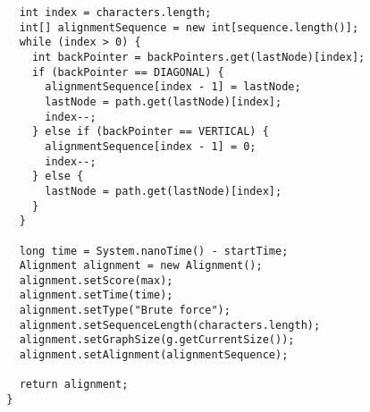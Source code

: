 \documentclass[thesis.tex]{subfiles}
\begin{document}
\begin{lstlisting}
    int index = characters.length;
    int[] alignmentSequence = new int[sequence.length()];
    while (index > 0) {
      int backPointer = backPointers.get(lastNode)[index];
      if (backPointer == DIAGONAL) {
        alignmentSequence[index - 1] = lastNode;
        lastNode = path.get(lastNode)[index];
        index--;
      } else if (backPointer == VERTICAL) {
        alignmentSequence[index - 1] = 0;
        index--;
      } else {
        lastNode = path.get(lastNode)[index];
      }
    }

    long time = System.nanoTime() - startTime;
    Alignment alignment = new Alignment();
    alignment.setScore(max);
    alignment.setTime(time);
    alignment.setType("Brute force");
    alignment.setSequenceLength(characters.length);
    alignment.setGraphSize(g.getCurrentSize());
    alignment.setAlignment(alignmentSequence);

    return alignment;
  }
\end{lstlisting}
\end{document}

